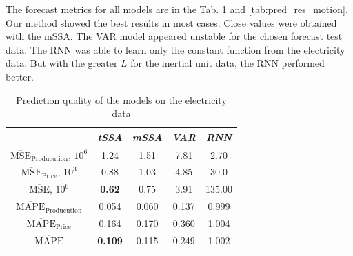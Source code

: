\documentclass[referee, pdflatex, sn-mathphys-num]{sn-jnl}
\theoremstyle{definition}
\theoremstyle{plain}
\begin{document}
	The forecast metrics for all models are in the Tab. \ref{tab:pred_res_electr} and \ref{tab:pred_res_motion}. Our method showed the best results in most cases. Close values were obtained with the mSSA. The VAR model appeared unstable for the chosen forecast test data. The RNN was able to learn only the constant function from the electricity data. But with the greater $ L $ for the inertial unit data, the RNN performed better.
	
	\def\arraystretch{1.2}
	\begin{table}[h]
		\centering
		\caption{Prediction quality of the models on the electricity data}\label{tab:pred_res_electr}
		\begin{tabular}{|c|c|c|c|c|}
			\hline
			& \textit{tSSA}  & \textit{mSSA} & \textit{VAR} & \textit{RNN} \\ \hline
			$ \overline{\text{MSE}}_{\text{Producution}} $, $10^6$ & 1.24           & 1.51          & 7.81         & 2.70         \\ \hline
			$ \overline{\text{MSE}}_{\text{Price}} $, $10^3$      & 0.88           & 1.03          & 4.85         & 30.0         \\ \hline
			$ \overline{\text{MSE}} $, $10^6$             & \textbf{0.62}  & 0.75          & 3.91         & 135.00       \\ \hline
			$ \overline{\text{MAPE}}_{\text{Producution}} $        & 0.054          & 0.060         & 0.137        & 0.999        \\ \hline
			$ \overline{\text{MAPE}}_{\text{Price}} $             & 0.164          & 0.170         & 0.360        & 1.004        \\ \hline
			$ \overline{\text{MAPE}} $                    & \textbf{0.109} & 0.115         & 0.249        & 1.002        \\ \hline
		\end{tabular}
	\end{table}
	
\end{document}
